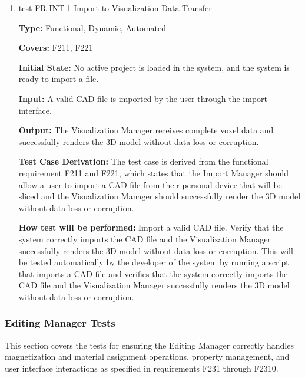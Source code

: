 \documentclass[12pt, titlepage]{article}
\begin{document}
\begin{enumerate}

\item{test-FR-INT-1 Import to Visualization Data Transfer\\}
\label{sec:t-int-1}

\textbf{Type:} Functional, Dynamic, Automated

\textbf{Covers:} F211, F221
					
\textbf{Initial State:} No active project is loaded in the system, and the system is ready to import a file.
					
\textbf{Input:} A valid CAD file is imported by the user through the import interface.
					
\textbf{Output:} The Visualization Manager receives complete voxel data and successfully renders the 3D model without data loss or corruption.

\textbf{Test Case Derivation:} The test case is derived from the functional requirement F211 and F221, which states that the Import Manager should allow a user to import a CAD file from their personal device that will be sliced and the Visualization Manager should successfully render the 3D model without data loss or corruption.
					
\textbf{How test will be performed:} Import a valid CAD file. Verify that the system correctly imports the CAD file and the Visualization Manager successfully renders the 3D model without data loss or corruption. This will be tested automatically by the developer of the system by running a script that imports a CAD file and verifies that the system correctly imports the CAD file and the Visualization Manager successfully renders the 3D model without data loss or corruption.


\end{enumerate}

\subsubsection{Editing Manager Tests}
This section covers the tests for ensuring the Editing Manager correctly
handles magnetization and material assignment operations, property management,
and user interface interactions as specified in requirements F231 through F2310.
\end{document}
